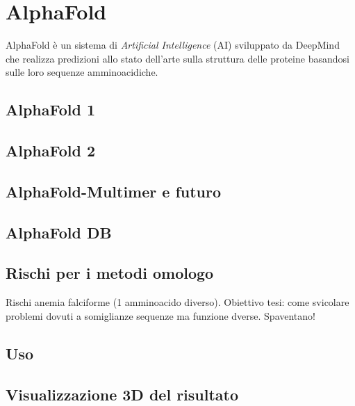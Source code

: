 \chapter{AlphaFold}
AlphaFold è un sistema di \textit{Artificial Intelligence }(AI) sviluppato da DeepMind che realizza predizioni allo stato dell'arte sulla struttura delle proteine basandosi sulle loro sequenze amminoacidiche.
\section{AlphaFold 1}
\section{AlphaFold 2}
\section{AlphaFold-Multimer e futuro}
\section{AlphaFold DB}



\section{Rischi per i metodi omologo}
Rischi anemia falciforme (1 amminoacido diverso).
Obiettivo tesi: come svicolare problemi dovuti a somiglianze sequenze ma funzione dverse. Spaventano! 
\section{Uso}
\section{Visualizzazione 3D del risultato}

\clearpage